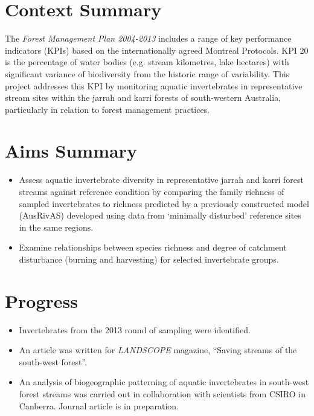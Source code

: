\documentclass[version=last, paper=a4, DIV=18, usenames, dvipsnames]{scrartcl}
\begin{document}
\section{Context Summary}



The \emph{Forest Management Plan 2004-2013} includes a range of key performance indicators (KPIs) based on the internationally agreed Montreal Protocols. KPI 20 is the percentage of water bodies (e.g. stream kilometres, lake hectares) with significant variance of biodiversity from the historic range of variability. This project addresses this KPI by monitoring aquatic invertebrates in representative stream sites within the jarrah and karri forests of south-western Australia, particularly in relation to forest management practices.






\section{Aims Summary}



\begin{itemize}

  \item Assess aquatic invertebrate diversity in representative jarrah and karri forest streams against reference condition by comparing the family richness of sampled invertebrates to richness predicted by a previously constructed model (AusRivAS) developed using data from `minimally disturbed' reference sites in the same regions.

  \item Examine relationships between species richness and degree of catchment disturbance (burning and harvesting) for selected invertebrate groups.

\end{itemize}






\section{Progress}



\begin{itemize}

  \item Invertebrates from the 2013 round of sampling were identified.

  \item An article was written for \emph{LANDSCOPE} magazine, ``Saving streams of the south-west forest''.

  \item An analysis of biogeographic patterning of aquatic invertebrates in south-west forest streams was carried out in collaboration with scientists from CSIRO in Canberra. Journal article is in preparation.

\end{itemize}
\end{document}
